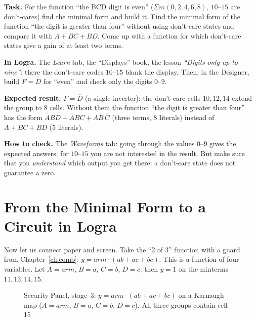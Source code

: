 \begin{diybox}
\textbf{Task.}  For the function ``the BCD digit is even''
($\Sigma m(0,2,4,6,8)$, $10$--$15$ are don't-cares) find the minimal form and
build it.  Find the minimal form of the function ``the digit is
greater than four'' without using don't-care states and compare it with
$A+BC+BD$.  Come up with a function for which don't-care states
give a gain of at least two terms.

\textbf{In Logra.} The \emph{Learn} tab, the ``Displays'' book, the lesson
\emph{``Digits only up to nine''}: there the don't-care codes $10$--$15$
blank the display. Then, in the Designer, build $F=\overline{D}$ for ``even''
and check only the digits $0$--$9$.

\textbf{Expected result.} $F=\overline{D}$ (a single inverter): the
don't-care cells $10,12,14$ extend the group to 8 cells. Without them the
function ``the digit is greater than four'' has the form
$\overline{A}BD+\overline{A}BC+A\overline{B}\,\overline{C}$ (three terms,
8 literals) instead of $A+BC+BD$ (5 literals).

\textbf{How to check.} The \emph{Waveforms} tab: going through the values
$0$--$9$ gives the expected answers; for $10$--$15$ you are not interested in
the result. But make sure that you \emph{understand} which output you get
there: a don't-care state does not guarantee a zero.
\end{diybox}

\section{From the Minimal Form to a Circuit in Logra}

Now let us connect paper and screen. Take the ``2 of 3'' function with a
guard from Chapter~\ref{ch:comb}: $y=arm\cdot(ab+ac+bc)$. This is a function
of four variables. Let $A=arm$, $B=a$, $C=b$, $D=c$; then $y=1$ on the
minterms $11,13,14,15$.

\begin{figure}[H]
\centering
{}
\caption{Security Panel, stage~3: $y = arm\cdot(ab+ac+bc)$ on a Karnaugh map ($A=arm$, $B=a$, $C=b$, $D=c$). All three groups contain cell 15}
\label{fig:karnaugh4_arm}
\end{figure}

